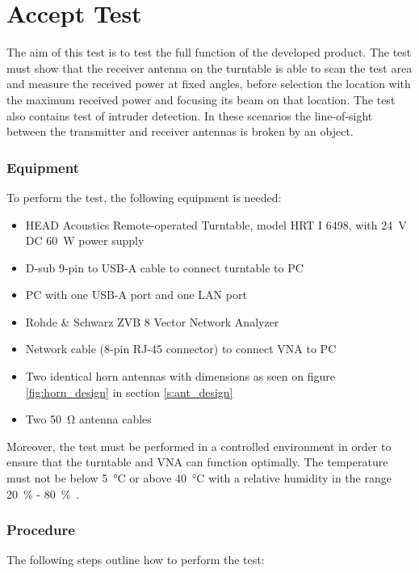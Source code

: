 \section{Accept Test} \label{s:accept_test}
The aim of this test is to test the full function of the developed product. The test must show that the receiver antenna on the turntable is able to scan the test area and measure the received power at fixed angles, before selection the location with the maximum received power and focusing its beam on that location. The test also contains test of intruder detection. In these scenarios the line-of-sight between the transmitter and receiver antennas is broken by an object. 

\subsubsection{Equipment}
To perform the test, the following equipment is needed:

\begin{itemize}
    \item HEAD Acoustics Remote-operated Turntable, model HRT I 6498, with \SI{24}{\volt} DC \SI{60}{W} power supply
    \item D-sub 9-pin to USB-A cable to connect turntable to PC
    \item PC with one USB-A port and one LAN port
    \item Rohde \& Schwarz ZVB 8 Vector Network Analyzer
    \item Network cable (8-pin RJ-45 connector) to connect VNA to PC
    \item Two identical horn antennas with dimensions as seen on figure \ref{fig:horn_design} in section \ref{s:ant_design}
    \item Two \SI{50}{\ohm} antenna cables
\end{itemize}

Moreover, the test must be performed in a controlled environment in order to ensure that the turntable and VNA can function optimally. The temperature must not be below \SI{5}{\celsius} or above \SI{40}{\celsius} with a relative humidity in the range \SI{20}{\percent} - \SI{80}{\percent}~\cite{hrt_i_data_sheet}\cite{vna_data_sheet_spec}.

\subsubsection{Procedure}
The following steps outline how to perform the test:

